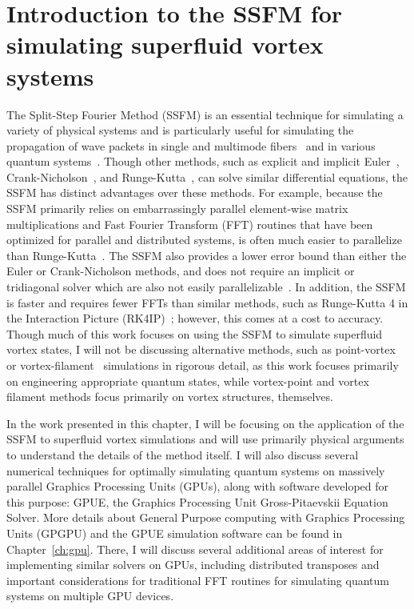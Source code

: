 \chapter{Introduction to the SSFM for simulating superfluid vortex systems}
\label{ch:splitop}
The Split-Step Fourier Method (SSFM) is an essential technique for simulating a variety of physical systems and is particularly useful for simulating the propagation of wave packets in single and multimode fibers~\cite{agrawal2000, sinkin2003, meirelles2005, min2003} and in various quantum systems~\cite{bayindir2015, weideman1986, wang2005}.
Though other methods, such as explicit and implicit Euler~\cite{butcher2016}, Crank-Nicholson~\cite{crank1947}, and Runge-Kutta~\cite{butcher2016}, can solve similar differential equations, the SSFM has distinct advantages over these methods.
For example, because the SSFM primarily relies on embarrassingly parallel element-wise matrix multiplications and Fast Fourier Transform (FFT) routines that have been optimized for parallel and distributed systems, is often much easier to parallelize than Runge-Kutta~\cite{murray2011}.
The SSFM also provides a lower error bound than either the Euler or Crank-Nicholson methods, and does not require an implicit or tridiagonal solver \cite{conte2017, thomas1949} which are also not easily parallelizable~\cite{goddeke2010, wang1981, sweet1977}.
In addition, the SSFM is faster and requires fewer FFTs than similar methods, such as Runge-Kutta 4 in the Interaction Picture (RK4IP)~\cite{brehler2017}; however, this comes at a cost to accuracy.
Though much of this work focuses on using the SSFM to simulate superfluid vortex states, I will not be discussing alternative methods, such as point-vortex~\cite{benzi1992} or vortex-filament~\cite{schwarz1988} simulations in rigorous detail, as this work focuses primarily on engineering appropriate quantum states, while vortex-point and vortex filament methods focus primarily on vortex structures, themselves.

In the work presented in this chapter, I will be focusing on the application of the SSFM to superfluid vortex simulations and will use primarily physical arguments to understand the details of the method itself.
I will also discuss several numerical techniques for optimally simulating quantum systems on massively parallel Graphics Processing Units (GPUs), along with software developed for this purpose: GPUE, the Graphics Processing Unit Gross-Pitaevskii Equation Solver.
More details about General Purpose computing with Graphics Processing Units (GPGPU) and the GPUE simulation software can be found in Chapter~\ref{ch:gpu}.
There, I will discuss several additional areas of interest for implementing similar solvers on GPUs, including distributed transposes and important considerations for traditional FFT routines for simulating quantum systems on multiple GPU devices.

